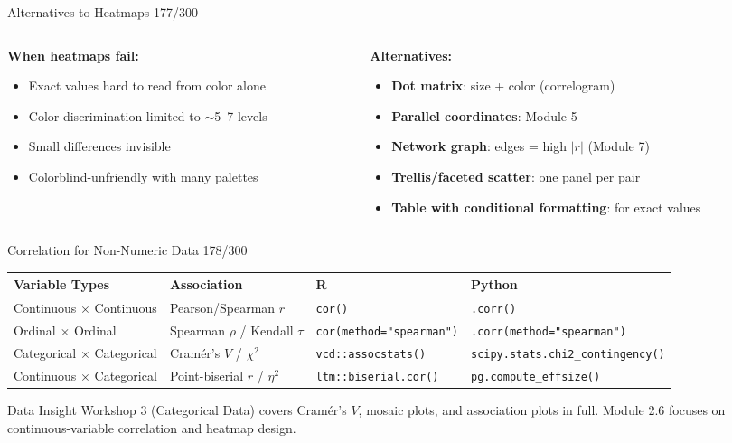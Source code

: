 \documentclass[10pt]{beamer}
\newcommand{\smark}[1]{\hfill{\scriptsize\color{codegray}#1}}
\begin{document}
\begin{frame}{Alternatives to Heatmaps}
\smark{177/300}
\begin{columns}[T]
\begin{column}{0.50\textwidth}
    \textbf{When heatmaps fail:}
    \begin{itemize}
        \item Exact values hard to read from color alone
        \item Color discrimination limited to $\sim$5--7 levels
        \item Small differences invisible
        \item Colorblind-unfriendly with many palettes
    \end{itemize}
\end{column}
\begin{column}{0.47\textwidth}
    \textbf{Alternatives:}
    \begin{itemize}
        \item \textbf{Dot matrix}: size + color (correlogram)
        \item \textbf{Parallel coordinates}: Module 5
        \item \textbf{Network graph}: edges = high $|r|$ (Module 7)
        \item \textbf{Trellis/faceted scatter}: one panel per pair
        \item \textbf{Table with conditional formatting}: for exact values
    \end{itemize}
\end{column}
\end{columns}
\end{frame}

\begin{frame}{Correlation for Non-Numeric Data}
\smark{178/300}
\centering\small
\begin{tabular}{@{}llll@{}}
    \toprule
    \textbf{Variable Types} & \textbf{Association} & \textbf{R} & \textbf{Python} \\
    \midrule
    Continuous $\times$ Continuous & Pearson/Spearman $r$ & \texttt{cor()} & \texttt{.corr()} \\
    Ordinal $\times$ Ordinal       & Spearman $\rho$ / Kendall $\tau$ & \texttt{cor(method="spearman")} & \texttt{.corr(method="spearman")} \\
    Categorical $\times$ Categorical & Cramér's $V$ / $\chi^2$ & \texttt{vcd::assocstats()} & \texttt{scipy.stats.chi2\_contingency()} \\
    Continuous $\times$ Categorical  & Point-biserial $r$ / $\eta^2$ & \texttt{ltm::biserial.cor()} & \texttt{pg.compute\_effsize()} \\
    \bottomrule
\end{tabular}

\vspace{0.3cm}
\begin{exampleblock}{Data Insight}
    \scriptsize Workshop 3 (Categorical Data) covers Cramér's $V$, mosaic plots, and association plots in full. Module 2.6 focuses on continuous-variable correlation and heatmap design.
\end{exampleblock}
\end{frame}
\end{document}
